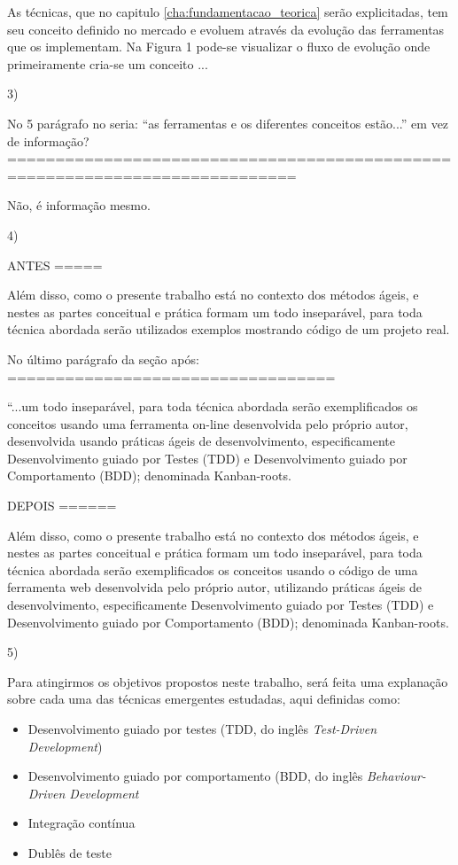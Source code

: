   As técnicas, que no capitulo \ref{cha:fundamentacao_teorica} serão explicitadas, tem seu conceito definido no mercado e evoluem através da evolução das ferramentas que os implementam. Na Figura 1 pode-se visualizar o fluxo de evolução onde primeiramente cria-se um conceito ...


3)

  No 5 parágrafo no seria: “as ferramentas e os diferentes conceitos estão...” em vez de informação?
  ============================================================================

  Não, é informação mesmo.



4)

  ANTES
  =====

  Além disso, como o presente trabalho está no contexto dos métodos ágeis, e nestes as partes conceitual e prática formam um todo inseparável, para toda técnica abordada serão utilizados exemplos mostrando código de um projeto real.


  No último parágrafo da seção após:
  ==================================

  “...um todo inseparável, para toda técnica abordada serão exemplificados os conceitos usando uma ferramenta on-line desenvolvida pelo próprio autor, desenvolvida usando práticas ágeis de desenvolvimento, especificamente Desenvolvimento guiado por Testes (TDD) e Desenvolvimento guiado por Comportamento (BDD); denominada Kanban-roots.


  DEPOIS
  ======

  Além disso, como o presente trabalho está no contexto dos métodos ágeis, e nestes as partes conceitual e prática formam um todo inseparável, para toda técnica abordada serão exemplificados os conceitos usando o código de uma ferramenta web desenvolvida pelo próprio autor, utilizando práticas ágeis de desenvolvimento, especificamente Desenvolvimento guiado por Testes (TDD) e Desenvolvimento guiado por Comportamento (BDD); denominada Kanban-roots.


5)

  Para atingirmos os objetivos propostos neste trabalho, será feita uma explanação sobre cada uma das técnicas emergentes estudadas, aqui definidas como:

  \begin{itemize}
    \item Desenvolvimento guiado por testes (TDD, do inglês \textit{Test-Driven Development})
    \item Desenvolvimento guiado por comportamento (BDD, do inglês \textit{Behaviour-Driven Development}
    \item Integração contínua
    \item Dublês de teste
  \end{itemize}

